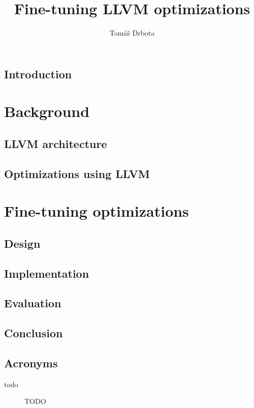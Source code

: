 \documentclass[thesis=M,english,hidelinks]{FITthesis}[2018/03/12]
\title{Fine-tuning LLVM optimizations}
\author{Tomáš Drbota} %
\begin{document}
\chapter{Introduction}



\part{Background}
\chapter{LLVM architecture}


\chapter{Optimizations using LLVM}


\part{Fine-tuning optimizations}
\chapter{Design}


\chapter{Implementation}


\chapter{Evaluation}


\chapter{Conclusion}





\appendix

\chapter{Acronyms}
\begin{description}
	\item[todo] TODO
\end{description}
\end{document}
